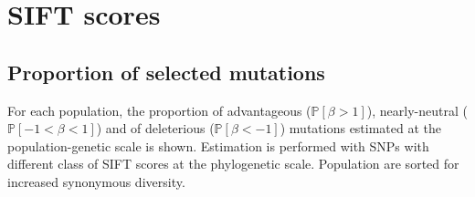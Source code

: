 \documentclass{article}
\newcommand{\proba}{\mathbb{P}}
\newcommand{\Spop}{\beta}
\newcommand{\polyDel}{\Spop < -1}
\newcommand{\polyNeutral}{-1 < \Spop < 1}
\newcommand{\polyAdv}{ \Spop > 1}
\newcommand{\PpolyDel}{\proba \left[ \polyDel \right]}
\newcommand{\PpolyNeutral}{\proba \left[ \polyNeutral \right]}
\newcommand{\PpolyAdv}{\proba \left[ \polyAdv \right]}
\begin{document}
    

    \newpage


    \section{SIFT scores}\label{sec:sift-scores}

    \subsection{Proportion of selected mutations}\label{subsec:proportion-of-selected-mutations}
    For each population, the proportion of advantageous ($\PpolyAdv$), nearly-neutral ($\PpolyNeutral$) and of deleterious ($\PpolyDel$) mutations estimated at the population-genetic scale is shown.
    Estimation is performed with SNPs with different class of SIFT scores at the phylogenetic scale.
    Population are sorted for increased synonymous diversity.
\end{document}
